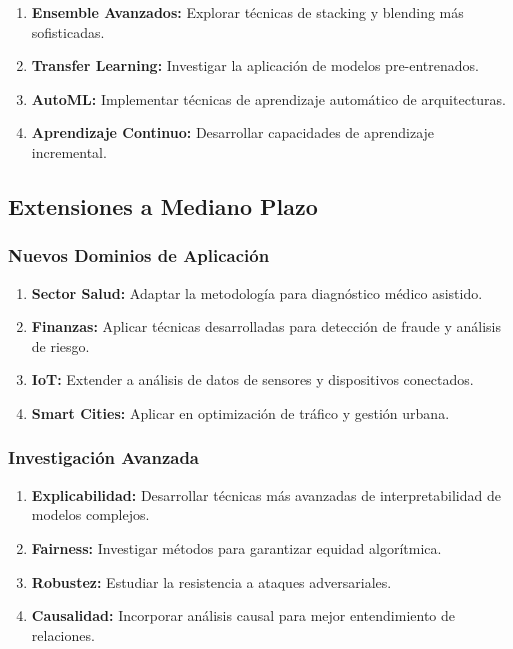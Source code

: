 \begin{enumerate}
    \item \textbf{Ensemble Avanzados:} Explorar técnicas de stacking y blending más sofisticadas.
    
    \item \textbf{Transfer Learning:} Investigar la aplicación de modelos pre-entrenados.
    
    \item \textbf{AutoML:} Implementar técnicas de aprendizaje automático de arquitecturas.
    
    \item \textbf{Aprendizaje Continuo:} Desarrollar capacidades de aprendizaje incremental.
\end{enumerate}

\subsection{Extensiones a Mediano Plazo}

\subsubsection{Nuevos Dominios de Aplicación}

\begin{enumerate}
    \item \textbf{Sector Salud:} Adaptar la metodología para diagnóstico médico asistido.
    
    \item \textbf{Finanzas:} Aplicar técnicas desarrolladas para detección de fraude y análisis de riesgo.
    
    \item \textbf{IoT:} Extender a análisis de datos de sensores y dispositivos conectados.
    
    \item \textbf{Smart Cities:} Aplicar en optimización de tráfico y gestión urbana.
\end{enumerate}

\subsubsection{Investigación Avanzada}

\begin{enumerate}
    \item \textbf{Explicabilidad:} Desarrollar técnicas más avanzadas de interpretabilidad de modelos complejos.
    
    \item \textbf{Fairness:} Investigar métodos para garantizar equidad algorítmica.
    
    \item \textbf{Robustez:} Estudiar la resistencia a ataques adversariales.
    
    \item \textbf{Causalidad:} Incorporar análisis causal para mejor entendimiento de relaciones.
\end{enumerate}

